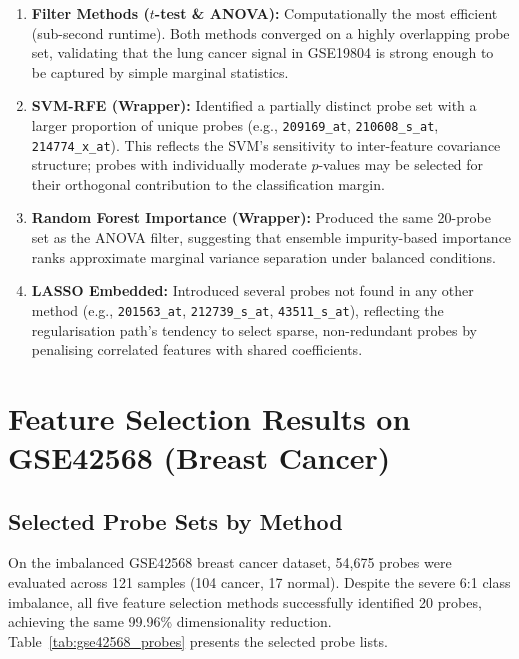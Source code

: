 \begin{enumerate}
    \item \textbf{Filter Methods ($t$-test \& ANOVA):} Computationally the most efficient (sub-second runtime). Both methods converged on a highly overlapping probe set, validating that the lung cancer signal in GSE19804 is strong enough to be captured by simple marginal statistics.

    \item \textbf{SVM-RFE (Wrapper):} Identified a partially distinct probe set with a larger proportion of unique probes (e.g., \texttt{209169\_at}, \texttt{210608\_s\_at}, \texttt{214774\_x\_at}). This reflects the SVM's sensitivity to inter-feature covariance structure; probes with individually moderate $p$-values may be selected for their orthogonal contribution to the classification margin.

    \item \textbf{Random Forest Importance (Wrapper):} Produced the same 20-probe set as the ANOVA filter, suggesting that ensemble impurity-based importance ranks approximate marginal variance separation under balanced conditions.

    \item \textbf{LASSO Embedded:} Introduced several probes not found in any other method (e.g., \texttt{201563\_at}, \texttt{212739\_s\_at}, \texttt{43511\_s\_at}), reflecting the regularisation path's tendency to select sparse, non-redundant probes by penalising correlated features with shared coefficients.
\end{enumerate}

\section{Feature Selection Results on GSE42568 (Breast Cancer)}

\subsection{Selected Probe Sets by Method}

On the imbalanced GSE42568 breast cancer dataset, 54,675 probes were evaluated across 121 samples (104 cancer, 17 normal). Despite the severe 6:1 class imbalance, all five feature selection methods successfully identified 20 probes, achieving the same 99.96\% dimensionality reduction. Table~\ref{tab:gse42568_probes} presents the selected probe lists.

